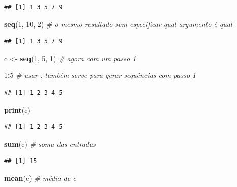\documentclass[
]{article}
\newenvironment{Shaded}{\begin{snugshade}}{\end{snugshade}}
\newcommand{\CommentTok}[1]{\textcolor[rgb]{0.56,0.35,0.01}{\textit{#1}}}
\newcommand{\DecValTok}[1]{\textcolor[rgb]{0.00,0.00,0.81}{#1}}
\newcommand{\KeywordTok}[1]{\textcolor[rgb]{0.13,0.29,0.53}{\textbf{#1}}}
\newcommand{\NormalTok}[1]{#1}
\newcommand{\OperatorTok}[1]{\textcolor[rgb]{0.81,0.36,0.00}{\textbf{#1}}}
\newcommand{\StringTok}[1]{\textcolor[rgb]{0.31,0.60,0.02}{#1}}
\begin{document}
\begin{verbatim}
## [1] 1 3 5 7 9
\end{verbatim}

\begin{Shaded}
\begin{Highlighting}[]
\KeywordTok{seq}\NormalTok{(}\DecValTok{1}\NormalTok{, }\DecValTok{10}\NormalTok{, }\DecValTok{2}\NormalTok{) }\CommentTok{# o mesmo resultado sem especificar qual argumento é qual}
\end{Highlighting}
\end{Shaded}

\begin{verbatim}
## [1] 1 3 5 7 9
\end{verbatim}

\begin{Shaded}
\begin{Highlighting}[]
\NormalTok{c <-}\StringTok{ }\KeywordTok{seq}\NormalTok{(}\DecValTok{1}\NormalTok{, }\DecValTok{5}\NormalTok{, }\DecValTok{1}\NormalTok{) }\CommentTok{# agora com um passo 1}

\DecValTok{1}\OperatorTok{:}\DecValTok{5} \CommentTok{# usar : também serve para gerar sequências com passo 1}
\end{Highlighting}
\end{Shaded}

\begin{verbatim}
## [1] 1 2 3 4 5
\end{verbatim}

\begin{Shaded}
\begin{Highlighting}[]
\KeywordTok{print}\NormalTok{(c)}
\end{Highlighting}
\end{Shaded}

\begin{verbatim}
## [1] 1 2 3 4 5
\end{verbatim}

\begin{Shaded}
\begin{Highlighting}[]
\KeywordTok{sum}\NormalTok{(c) }\CommentTok{# soma das entradas}
\end{Highlighting}
\end{Shaded}

\begin{verbatim}
## [1] 15
\end{verbatim}

\begin{Shaded}
\begin{Highlighting}[]
\KeywordTok{mean}\NormalTok{(c) }\CommentTok{# média de c}
\end{Highlighting}
\end{Shaded}
\end{document}
